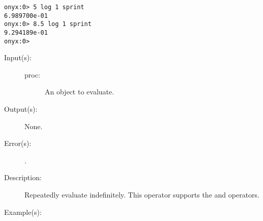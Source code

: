 \begin{description}
\begin{description}
\begin{verbatim}
onyx:0> 5 log 1 sprint
6.989700e-01
onyx:0> 8.5 log 1 sprint
9.294189e-01
onyx:0>
		\end{verbatim}
	\end{description}
\label{systemdict:loop}
\item[{\onyxop{proc}{loop}{--}}: ]
	\begin{description}\item[]
	\item[Input(s): ]
		\begin{description}\item[]
		\item[proc: ]
			An object to evaluate.
		\end{description}
	\item[Output(s): ] None.
	\item[Error(s): ]
		\begin{description}\item[]
		\item[.]
		\end{description}
	\item[Description: ]
		Repeatedly evaluate  indefinitely.  This operator
		supports the
		 and
		 operators.
	\item[Example(s): ]\begin{verbatim}


\end{verbatim}
\end{description}
\end{description}
